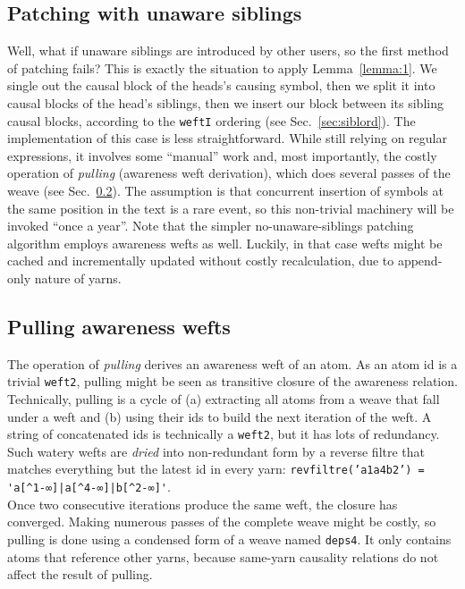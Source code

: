 \documentclass{sig-alternate}
\begin{document}
\subsection{Patching with unaware siblings} \label{sec:unre}

Well, what if unaware siblings are introduced by other users, so the first method of patching fails?
This is exactly the situation to apply Lemma~\ref{lemma:1}. 
We single out the causal block of the heads's causing symbol, then we split it into causal blocks of the head's siblings, then we insert our block between its sibling causal blocks, according to the {\tt weftI} ordering (see Sec.~\ref{sec:siblord}).
The implementation of this case is less straightforward.
While still relying on regular expressions, it involves some ``manual'' work and, most importantly, the costly operation of \emph{pulling} (awareness weft derivation), which does several passes of the weave (see Sec.~\ref{sec:pulling}).
The assumption is that concurrent insertion of symbols at the same position in the text is a rare event, so this non-trivial machinery will be invoked ``once a year''.
Note that the simpler no-unaware-siblings patching algorithm employs awareness wefts as well.
Luckily, in that case wefts might be cached and incrementally updated without costly recalculation, due to append-only nature of yarns.

\subsection{Pulling awareness wefts} \label{sec:pulling}

The operation of \emph{pulling} derives an awareness weft of an atom.
As an atom id is a trivial {\tt weft2}, pulling might be seen as transitive closure of the awareness relation.
Technically, pulling is a cycle of (a) extracting all atoms from a weave that fall under a weft and (b) using their ids to build the next iteration of the weft.
A string of concatenated ids is technically a {\tt weft2}, but it has lots of redundancy.
Such watery wefts are \emph{dried} into non-redundant form by a reverse filtre that matches everything but the latest id in every yarn:
{\tt revfiltre('a1a4b2') = \verb+'a[^1-∞]|a[^4-∞]|b[^2-∞]'+}.\\
Once two consecutive iterations produce the same weft, the closure has converged.
Making numerous passes of the complete weave might be costly, so pulling is done using a condensed form of a weave named {\tt deps4}.
It only contains atoms that reference other yarns, because same-yarn causality relations do not affect the result of pulling.
\end{document}
